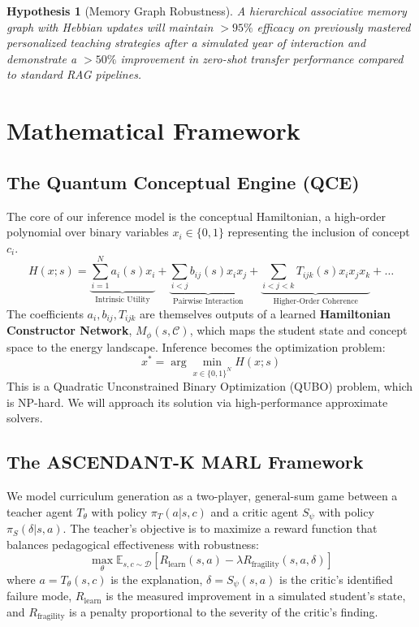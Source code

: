 \documentclass[11pt, letterpaper]{article}
\newtheorem{hypothesis}[theorem]{Hypothesis}
\begin{document}
\begin{hypothesis}[Memory Graph Robustness]
A hierarchical associative memory graph with Hebbian updates will maintain $>95\%$ efficacy on previously mastered personalized teaching strategies after a simulated year of interaction and demonstrate a $>50\%$ improvement in zero-shot transfer performance compared to standard RAG pipelines.
\end{hypothesis}

\section{Mathematical Framework}

\subsection{The Quantum Conceptual Engine (QCE)}
The core of our inference model is the conceptual Hamiltonian, a high-order polynomial over binary variables $x_i \in \{0, 1\}$ representing the inclusion of concept $c_i$.
\begin{equation}
H(x;s) = \underbrace{\sum_{i=1}^N a_i(s) x_i}_{\text{Intrinsic Utility}} + \underbrace{\sum_{i<j} b_{ij}(s) x_i x_j}_{\text{Pairwise Interaction}} + \underbrace{\sum_{i<j<k} T_{ijk}(s) x_i x_j x_k}_{\text{Higher-Order Coherence}} + \dots
\label{eq:hamiltonian}
\end{equation}
The coefficients $a_i, b_{ij}, T_{ijk}$ are themselves outputs of a learned \textbf{Hamiltonian Constructor Network}, $M_\phi(s, \mathcal{C})$, which maps the student state and concept space to the energy landscape. Inference becomes the optimization problem:
\begin{equation}
x^* = \arg\min_{x \in \{0, 1\}^N} H(x;s)
\end{equation}
This is a Quadratic Unconstrained Binary Optimization (QUBO) problem, which is NP-hard. We will approach its solution via high-performance approximate solvers.

\subsection{The ASCENDANT-K MARL Framework}
We model curriculum generation as a two-player, general-sum game between a teacher agent $T_\theta$ with policy $\pi_T(a|s,c)$ and a critic agent $S_\psi$ with policy $\pi_S(\delta|s,a)$. The teacher's objective is to maximize a reward function that balances pedagogical effectiveness with robustness:
\begin{equation}
\max_{\theta} \mathbb{E}_{s,c \sim \mathcal{D}} \left[ R_{\text{learn}}(s, a) - \lambda R_{\text{fragility}}(s, a, \delta) \right]
\end{equation}
where $a = T_\theta(s,c)$ is the explanation, $\delta = S_\psi(s,a)$ is the critic's identified failure mode, $R_{\text{learn}}$ is the measured improvement in a simulated student's state, and $R_{\text{fragility}}$ is a penalty proportional to the severity of the critic's finding.
\end{document}
